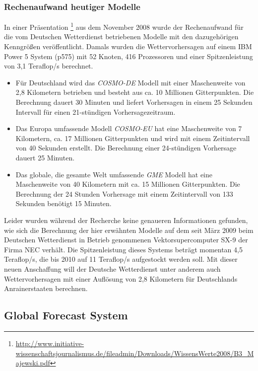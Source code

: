 \subsubsection{Rechenaufwand heutiger Modelle}

In einer Präsentation
\footnote{\url{http://www.initiative-wissenschaftsjournalismus.de/fileadmin/Downloads/WissensWerte2008/B3_Majewski.pdf}}
aus dem November 2008 wurde der Rechenaufwand für die vom Deutschen
Wetterdienst betriebenen Modelle mit den dazugehörigen Kenngrößen
veröffentlicht. Damals wurden die Wettervorhersagen auf einem IBM
Power 5 System (p575) mit 52 Knoten, 416 Prozessoren und einer
Spitzenleistung von 3,1 Teraflop/s berechnet.

\begin{itemize}
\item Für Deutschland wird das \textit{COSMO-DE} Modell mit einer
  Maschenweite von 2,8 Kilometern betrieben und besteht aus ca. 10
  Millionen Gitterpunkten. Die Berechnung dauert 30 Minuten und
  liefert Vorhersagen in einem 25 Sekunden Intervall für einen
  21-stündigen Vorhersagezeitraum.
\item Das Europa umfassende Modell \textit{COSMO-EU} hat eine
  Maschenweite von 7 Kilometern, ca. 17 Millionen Gitterpunkten und
  wird mit einem Zeitintervall von 40 Sekunden erstellt. Die
  Berechnung einer 24-stündigen Vorhersage dauert 25 Minuten.
\item Das globale, die gesamte Welt umfassende \textit{GME} Modell hat
  eine Maschenweite von 40 Kilometern mit ca. 15 Millionen
  Gitterpunkten. Die Berechnung der 24 Stunden Vorhersage mit einem
  Zeitintervall von 133 Sekunden benötigt 15 Minuten.
\end{itemize}

Leider wurden während der Recherche keine genaueren Informationen
gefunden, wie sich die Berechnung der hier erwähnten Modelle auf dem
seit März 2009 beim Deutschen Wetterdienst in Betrieb genommenen
Vektorsupercomputer SX-9 der Firma NEC verhält. Die Spitzenleistung
dieses Systems beträgt momentan 4,5 Teraflop/s, die bis 2010 auf 11
Teraflop/s aufgestockt werden soll. Mit dieser neuen Anschaffung will
der Deutsche Wetterdienst unter anderem auch Wettervorhersagen mit
einer Auflösung von 2,8 Kilometern für Deutschlands Anrainerstaaten
berechnen.

\subsection{Global Forecast System}

